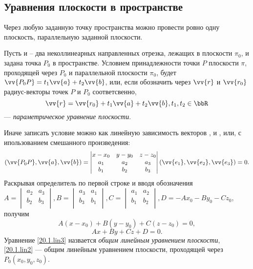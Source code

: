 \subsection{Уравнения плоскости в пространстве}
\begin{axiome}
Через любую заданную точку пространства можно провести ровно одну плоскость, параллельную заданной плоскости.
\end{axiome}

Пусть  и  -- два неколлинеарных направленных отрезка, лежащих в плоскости $\pi_0$, и задана точка $P_0$ в пространстве. Условием принадлежности точки $P$ плоскости $\pi$, проходящей через $P_0$ и параллельной плоскости $\pi_0$, будет $\vv{P_0P}=t_1\vv{a}+t_2\vv{b}$, или, если обозначить через $\vv{r}$ и $\vv{r_0}$ радиус-векторы точек $P$ и $P_0$ соответсвенно,
\begin{equation}\label{20.1.par3}
\vv{r}=\vv{r_0}+t_1\vv{a}+t_2\vv{b}, t_1,t_2 \in \bbR
\end{equation}
--- \textit{параметрическое уравнение плоскости}.

Иначе записать условие можно как линейную зависимость векторов ,  и , или, с ипользованием смешанного произведения:
\begin{equation}\label{20.1.mix1}
(\vv{P_0P},\vv{a}, \vv{b})=\begin{vmatrix}
x-x_0 & y-y_0 & z-z_0 \\
a_1 & a_2 & a_3 \\
b_1 & b_2 & b_3 \\
\end{vmatrix}(\vv{e_1},\vv{e_2},\vv{e_3})=0.
\end{equation}
Раскрывая определитель по первой строке и вводя обозначения $A=\begin{vmatrix}
a_2 & a_3 \\
b_2 & b_3 \\
\end{vmatrix}, B=\begin{vmatrix}
a_3 & a_1 \\
b_3 & b_1 \\
\end{vmatrix}, C=\begin{vmatrix}
a_1 & a_2 \\
b_1 & b_2 \\
\end{vmatrix}, D=-Ax_0-By_0-Cz_0$, получим
\begin{equation}\label{20.1.lin2}
A(x-x_0)+B(y-y_0)+C(z-z_0)=0,
\end{equation}
\begin{equation}\label{20.1.lin3}
Ax+By+Cz+D=0.
\end{equation}
Уравнение \eqref{20.1.lin3} назвается \textit{общим линейным уравнением плоскости}, \eqref{20.1.lin2} --- общим линейным уравнением плоскости, проходящей через $P_0(x_0,y_0,z_0)$.

